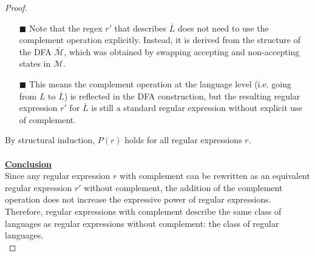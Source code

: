 \documentclass[12pt]{article}
\begin{document}
\begin{proof}
\begin{itemize}
            \begin{itemize}
                \small
                \item[$\blacksquare$] Note that the regex \( r' \) that describes \( \overline{L} \) does not need to use the complement operation explicitly. Instead, it is derived from the structure of the DFA \( \overline{\mathcal{M}} \), which was obtained by swapping accepting and non-accepting states in \( \mathcal{M} \).
                \item[$\blacksquare$] This means the complement operation at the language level (i.e. going from \( L \) to \( \overline{L} \)) is reflected in the DFA construction, but the resulting regular expression \( r' \) for \( \overline{L} \) is still a standard regular expression without explicit use of complement.
                \normalsize
            \end{itemize}
        \end{itemize}
        By structural induction, \( P(r) \) holds for all regular expressions \( r \). \\
        \\
        \underline{\textbf{Conclusion}} \\
        Since any regular expression \( r \) with complement can be rewritten as an equivalent regular expression \( r' \) without complement, the addition of the complement operation does not increase the expressive power of regular expressions. \\
        Therefore, regular expressions with complement describe the same class of languages as regular expressions without complement: the class of regular languages. \\
\end{proof}
\pagebreak
\end{document}
